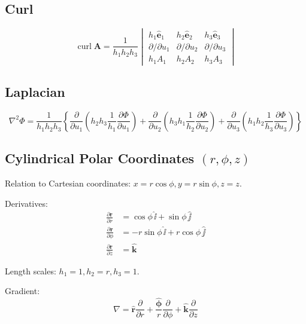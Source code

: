 \documentclass{article}
\theoremstyle{definition}
\theoremstyle{definition}
\theoremstyle{remark}
\newcommand{\vecr}{\mathbf{r}}
\newcommand{\vecA}{\mathbf{A}}
\newcommand{\bhat}[1]{\mathbf{\hat{#1}}}
\newcommand{\ihat}{\bhat{\ii}}
\newcommand{\jhat}{\bhat{\jj}}
\newcommand{\khat}{\bhat{k}}
\DeclareMathOperator{\vcurl}{curl}
\begin{document}
\subsection{Curl}

\begin{equation*}
    \vcurl \vecA = \frac{1}{h_1 h_2 h_3}
    \begin{vmatrix}
        h_1 \bhat{e}_1 & h_2 \bhat{e}_2 & h_3 \bhat{e}_3 \\
        \partial / \partial u_1 & \partial / \partial u_2 & \partial / \partial u_3 \\
        h_1 A_1 & h_2 A_2 & h_3 A_3
    \end{vmatrix}
\end{equation*}

\subsection{Laplacian}

\begin{equation*}
    \nabla^2 \Phi
    = \frac{1}{h_1 h_2 h_3} \left\{
    \frac{\partial}{\partial u_1} \left(h_2 h_3 \frac{1}{h_1} \frac{\partial \Phi}{\partial u_1}\right)
    + \frac{\partial}{\partial u_2} \left(h_3 h_1 \frac{1}{h_2} \frac{\partial \Phi}{\partial u_2}\right)
    + \frac{\partial}{\partial u_3} \left(h_1 h_2 \frac{1}{h_3} \frac{\partial \Phi}{\partial u_3}\right)
    \right\}
\end{equation*}

\subsection{Cylindrical Polar Coordinates $(r, \phi, z)$}

Relation to Cartesian coordinates: $x = r \cos \phi, y = r \sin \phi, z = z$.

\noindent Derivatives:
\begin{align*}
    \frac{\partial \vecr}{\partial r} &= \cos \phi \,\ihat + \sin \phi \,\jhat \\
    \frac{\partial \vecr}{\partial \phi} &= -r \sin \phi \,\ihat + r \cos \phi \,\jhat \\
    \frac{\partial \vecr}{\partial z} &= \khat
\end{align*}

\noindent Length scales: $h_1 = 1, h_2 = r, h_3 = 1$.

\noindent Gradient:
\begin{equation*}
    \nabla = \bhat{r} \frac{\partial}{\partial r} + \frac{\bhat{\phi}}{r} \frac{\partial}{\partial \phi} + \khat \frac{\partial}{\partial z}
\end{equation*}
\end{document}
